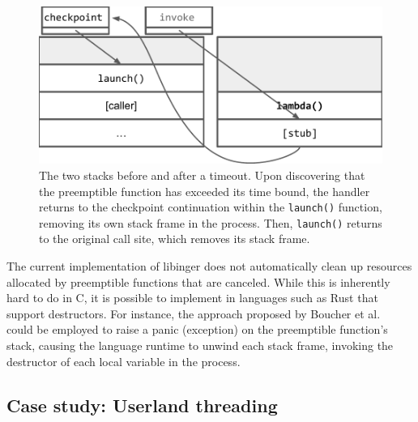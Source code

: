 \begin{figure}
\includegraphics[width=\columnwidth]{figs/twostacks}
\caption{The two stacks before and after a timeout.  \textnormal{Upon discovering
that the preemptible function has exceeded its time bound, the handler returns to the
checkpoint continuation within the \texttt{launch()} function, removing its own stack
frame in the process.  Then, \texttt{launch()} returns to the original call site,
which removes its stack frame.}}
\label{fig:twostacks}
\end{figure}

The current implementation of libinger does not automatically clean up resources
allocated by preemptible functions that are canceled.  While this is inherently hard
to do in C, it is possible to implement in languages such as Rust that support
destructors.  For instance, the approach proposed by Boucher et
al.~\cite{boucher:atc2018} could be employed to raise a panic (exception) on the
preemptible function's stack, causing the language runtime to unwind each stack frame,
invoking the destructor of each local variable in the process.

\subsection{Case study: Userland threading}
\label{sec:threading}
